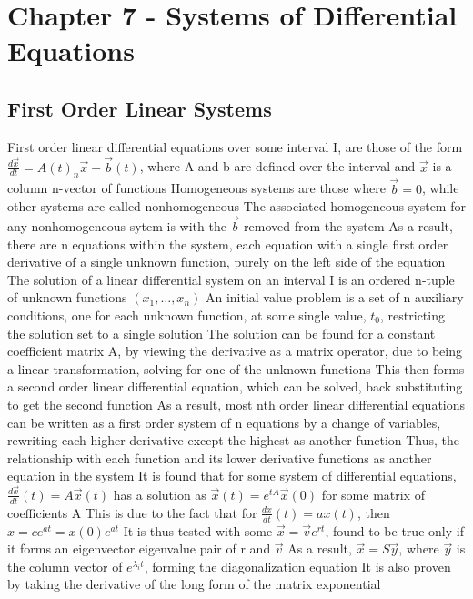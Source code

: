 \documentclass[11 pt, twoside]{article}
\newenvironment{outline*}
{
	\begin{outline}[enumerate]
	}
	{\end{outline}
}
\begin{document}
\section{Chapter 7 - Systems of Differential Equations}
\subsection{First Order Linear Systems}
\begin{outline*}
\1 First order linear differential equations over some interval I, are those of the form $\frac{d\vec{x}}{dt} = A(t)_n\vec{x} + \vec{b}(t)$, where A and b are defined over the interval and $\vec{x}$ is a column n-vector of functions
\2 Homogeneous systems are those where $\vec{b} = 0$, while other systems are called nonhomogeneous
\3 The associated homogeneous system for any nonhomogeneous sytem is with the $\vec{b}$ removed from the system
\2 As a result, there are n equations within the system, each equation with a single first order derivative of a single unknown function, purely on the left side of the equation
\1 The solution of a linear differential system on an interval I is an ordered n-tuple of unknown functions $(x_1, \dots, x_n)$
\2 An initial value problem is a set of n auxiliary conditions, one for each unknown function, at some single value, $t_0$, restricting the solution set to a single solution
\1 The solution can be found for a constant coefficient matrix A, by viewing the derivative as a matrix operator, due to being a linear transformation, solving for one of the unknown functions
\2 This then forms a second order linear differential equation, which can be solved, back substituting to get the second function
\2 As a result, most nth order linear differential equations can be written as a first order system of n equations by a change of variables, rewriting each higher derivative except the highest as another function
\3 Thus, the relationship with each function and its lower derivative functions as another equation in the system
\1 It is found that for some system of differential equations, $\frac{d\vec{x}}{dt}(t) = A\vec{x}(t)$ has a solution as $\vec{x}(t) = e^{tA}\vec{x}(0)$ for some matrix of coefficients A
\2 This is due to the fact that for $\frac{dx}{dt}(t) = ax(t)$, then $x = ce^{at} = x(0)e^{at}$
\3 It is thus tested with some $\vec{x} = \vec{v}e^{rt}$, found to be true only if it forms an eigenvector eigenvalue pair of r and $\vec{v}$
\3 As a result, $\vec{x} = S\vec{y}$, where $\vec{y}$ is the column vector of $e^{\lambda_i t}$, forming the diagonalization equation
\2 It is also proven by taking the derivative of the long form of the matrix exponential
\end{outline*}
\end{document}
